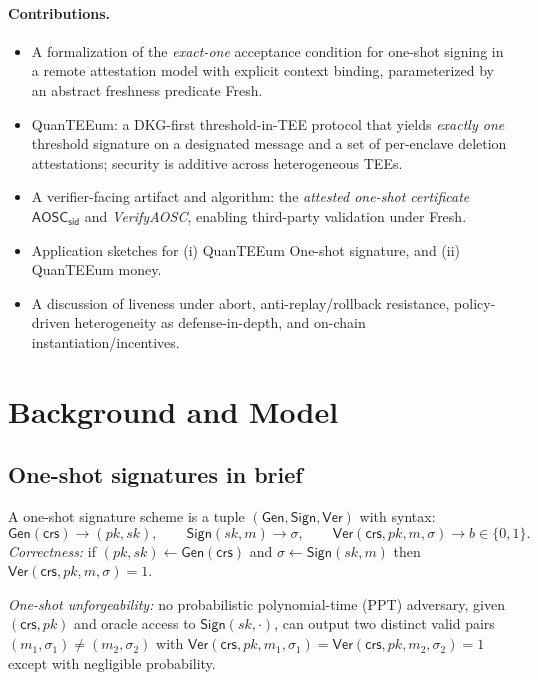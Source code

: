 \documentclass[runningheads,orivec]{llncs}
\newcommand{\prot}{\textsf{QuanTEEum}}
\newcommand{\sid}{\mathsf{sid}}
\begin{document}
\paragraph{Contributions.}
\begin{itemize}[leftmargin=*,itemsep=0.25em,topsep=0.25em]
  \item A formalization of the \emph{exact-one} acceptance condition for one-shot signing in a remote attestation model with explicit context binding, parameterized by an abstract freshness predicate \textsf{Fresh}.
  \item \prot{}: a DKG-first threshold-in-TEE protocol that yields \emph{exactly one} threshold signature on a designated message and a set of per-enclave deletion attestations; security is additive across heterogeneous TEEs.
  \item A verifier-facing artifact and algorithm: the \emph{attested one-shot certificate} $\mathsf{AOSC}_\sid$ and \emph{VerifyAOSC}, enabling third-party validation under \textsf{Fresh}.
  \item Application sketches for (i) QuanTEEum One-shot signature, and (ii) QuanTEEum money.
  \item A discussion of liveness under abort, anti-replay/rollback resistance, policy-driven heterogeneity as defense-in-depth, and on-chain instantiation/incentives.
\end{itemize}

\section{Background and Model}
\subsection{One-shot signatures in brief}
A one-shot signature scheme \cite{amos2020one} is a tuple $(\mathsf{Gen},\mathsf{Sign},\mathsf{Ver})$ with syntax:
\[
\mathsf{Gen}(\mathsf{crs}) \rightarrow (pk,sk),\qquad
\mathsf{Sign}(sk,m) \rightarrow \sigma,\qquad
\mathsf{Ver}(\mathsf{crs},pk,m,\sigma) \rightarrow b \in \{0,1\}.
\]
\emph{Correctness:} if $(pk,sk) \leftarrow \mathsf{Gen}(\mathsf{crs})$ and $\sigma \leftarrow \mathsf{Sign}(sk,m)$ then $\mathsf{Ver}(\mathsf{crs},pk,m,\sigma)=1$. 

\smallskip
\noindent\emph{One-shot unforgeability:} no probabilistic polynomial-time (PPT) adversary, given $(\mathsf{crs},pk)$ and oracle access to $\mathsf{Sign}(sk,\cdot)$, can output two distinct valid pairs $(m_1,\sigma_1)\neq(m_2,\sigma_2)$ with $\mathsf{Ver}(\mathsf{crs},pk,m_1,\sigma_1)=\mathsf{Ver}(\mathsf{crs},pk,m_2,\sigma_2)=1$ except with negligible probability.
\end{document}
